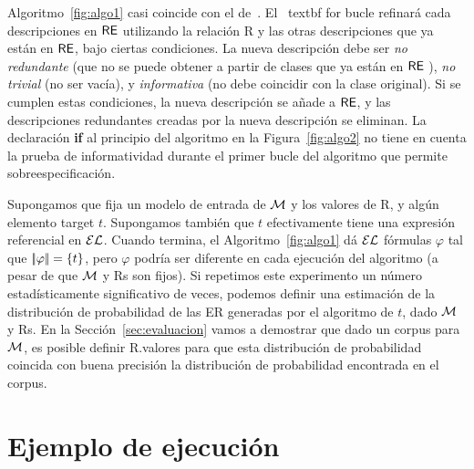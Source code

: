 Algoritmo~\ref{fig:algo1} casi coincide con el de~\cite{arec2:2008:Areces}. El \ textbf {for} bucle refinar\'a cada descripciones en $\textsf{RE}$ utilizando la relaci\'on R y las otras descripciones que ya est\'an en $\textsf{RE} $, bajo ciertas condiciones. La nueva descripci\'on debe ser \emph{no redundante} (que no se puede obtener a partir de clases que ya est\'an en $\textsf{RE}$ ), \emph{no trivial} (no ser vac\'{i}a), y \emph{informativa} (no debe coincidir con la clase original). Si se cumplen estas condiciones, la nueva descripci\'on se a\~nade a $\textsf{RE} $, y las descripciones redundantes creadas por la nueva descripci\'on se eliminan. La declaraci\'on \textbf{if} al principio del algoritmo en la Figura~\ref{fig:algo2} no tiene en cuenta la prueba de informatividad durante el primer bucle del algoritmo que permite sobreespecificaci\'on.

Supongamos que fija un modelo de entrada de $\mathcal{M}$ y los valores de R, y alg\'un elemento target $t$. Supongamos tambi\'en que $t$ efectivamente tiene una expresi\'on referencial en $\mathcal{EL}$. Cuando termina, el Algoritmo~\ref{fig:algo1} d\'a $\mathcal{EL}$ f\'ormulas $\varphi$ tal que $|\!|\varphi|\!| = \{t\}$, pero $\varphi$ podr\'{i}a ser diferente en cada ejecuci\'on del algoritmo (a pesar de que $\mathcal{M}$ y Rs son fijos). Si repetimos este experimento un n\'umero estad\'{i}sticamente significativo de veces, podemos definir una estimaci\'on de la distribuci\'on de probabilidad de las ER generadas por el algoritmo de $t $, dado $\mathcal{M}$ y Rs. En la Secci\'on~\ref{sec:evaluacion} vamos a demostrar que dado un corpus para $\mathcal{M}$, es posible definir R.\puse valores para que esta distribuci\'on de probabilidad coincida con buena precisi\'on la distribuci\'on de probabilidad encontrada en el corpus.



\section{Ejemplo de ejecuci\'on}